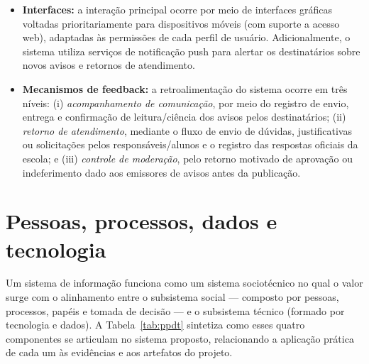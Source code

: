\documentclass[a4paper,12pt]{report}
\begin{document}
\begin{itemize}
    \item \textbf{Interfaces:} a interação principal ocorre por meio de interfaces gráficas voltadas prioritariamente para dispositivos móveis (com suporte a acesso web), adaptadas às permissões de cada perfil de usuário. Adicionalmente, o sistema utiliza serviços de notificação push para alertar os destinatários sobre novos avisos e retornos de atendimento.
    
    \item \textbf{Mecanismos de feedback:} a retroalimentação do sistema ocorre em três níveis: (i) \textit{acompanhamento de comunicação}, por meio do registro de envio, entrega e confirmação de leitura/ciência dos avisos pelos destinatários; (ii) \textit{retorno de atendimento}, mediante o fluxo de envio de dúvidas, justificativas ou solicitações pelos responsáveis/alunos e o registro das respostas oficiais da escola; e (iii) \textit{controle de moderação}, pelo retorno motivado de aprovação ou indeferimento dado aos emissores de avisos antes da publicação.
\end{itemize}

\section{Pessoas, processos, dados e tecnologia}

Um sistema de informação funciona como um sistema sociotécnico no qual o valor surge com o alinhamento entre o subsistema social — composto por pessoas, processos, papéis e tomada de decisão — e o subsistema técnico (formado por tecnologia e dados). A Tabela~\ref{tab:ppdt} sintetiza como esses quatro componentes se articulam no sistema proposto, relacionando a aplicação prática de cada um às evidências e aos artefatos do projeto.
\end{document}
